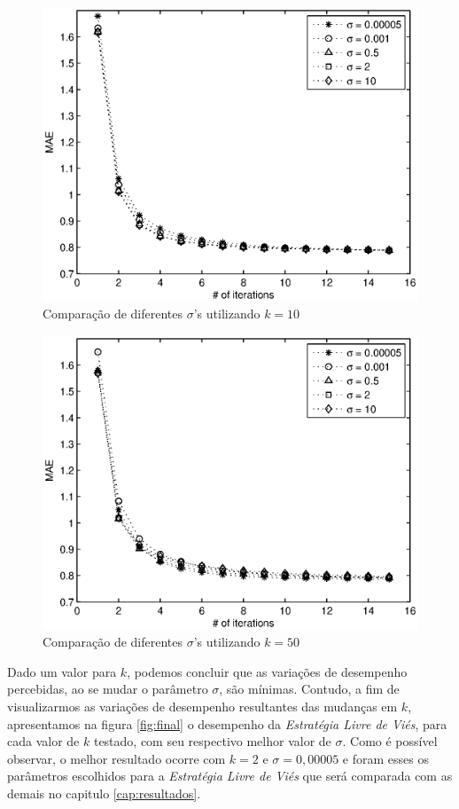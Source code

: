 \begin{figure}[ht]
\centering
\includegraphics{10dimensions.eps}
\caption{Comparação de diferentes $\sigma$'s utilizando $k=10$}
\label{fig:10dimensions}
\end{figure}

\begin{figure}[ht]
\centering
\includegraphics{50dimensions.eps}
\caption{Comparação de diferentes $\sigma$'s utilizando $k=50$}
\label{fig:50dimensions}
\end{figure}

Dado um valor para $k$, podemos concluir que as variações de desempenho percebidas, ao se mudar o parâmetro $\sigma$, são mínimas. Contudo, a fim de visualizarmos as variações de desempenho resultantes das mudanças em $k$, apresentamos na figura \ref{fig:final} o desempenho da \textit{Estratégia Livre de Viés}, para cada valor de $k$ testado, com seu respectivo melhor valor de $\sigma$. Como é possível observar, o melhor resultado ocorre com $k=2$ e $\sigma=0,00005$ e foram esses os parâmetros escolhidos para a \textit{Estratégia Livre de Viés} que será comparada com as demais no capitulo \ref{cap:resultados}.

